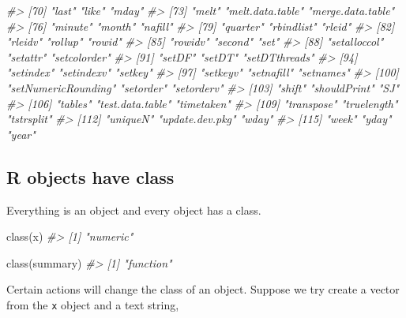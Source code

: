 \documentclass[
]{book}
\newenvironment{Shaded}{\begin{snugshade}}{\end{snugshade}}
\newcommand{\CommentTok}[1]{\textcolor[rgb]{0.56,0.35,0.01}{\textit{#1}}}
\newcommand{\FunctionTok}[1]{\textcolor[rgb]{0.00,0.00,0.00}{#1}}
\newcommand{\NormalTok}[1]{#1}
\begin{document}
\begin{Shaded}
\begin{Highlighting}[]
\CommentTok{\#\textgreater{}  [70] "last"               "like"               "mday"              }
\CommentTok{\#\textgreater{}  [73] "melt"               "melt.data.table"    "merge.data.table"  }
\CommentTok{\#\textgreater{}  [76] "minute"             "month"              "nafill"            }
\CommentTok{\#\textgreater{}  [79] "quarter"            "rbindlist"          "rleid"             }
\CommentTok{\#\textgreater{}  [82] "rleidv"             "rollup"             "rowid"             }
\CommentTok{\#\textgreater{}  [85] "rowidv"             "second"             "set"               }
\CommentTok{\#\textgreater{}  [88] "setalloccol"        "setattr"            "setcolorder"       }
\CommentTok{\#\textgreater{}  [91] "setDF"              "setDT"              "setDTthreads"      }
\CommentTok{\#\textgreater{}  [94] "setindex"           "setindexv"          "setkey"            }
\CommentTok{\#\textgreater{}  [97] "setkeyv"            "setnafill"          "setnames"          }
\CommentTok{\#\textgreater{} [100] "setNumericRounding" "setorder"           "setorderv"         }
\CommentTok{\#\textgreater{} [103] "shift"              "shouldPrint"        "SJ"                }
\CommentTok{\#\textgreater{} [106] "tables"             "test.data.table"    "timetaken"         }
\CommentTok{\#\textgreater{} [109] "transpose"          "truelength"         "tstrsplit"         }
\CommentTok{\#\textgreater{} [112] "uniqueN"            "update.dev.pkg"     "wday"              }
\CommentTok{\#\textgreater{} [115] "week"               "yday"               "year"}
\end{Highlighting}
\end{Shaded}

\hypertarget{r-objects-have-class}{%
\subsection{R objects have class}\label{r-objects-have-class}}

Everything is an object and every object has a class.

\begin{Shaded}
\begin{Highlighting}[]
\FunctionTok{class}\NormalTok{(x)}
\CommentTok{\#\textgreater{} [1] "numeric"}

\FunctionTok{class}\NormalTok{(summary)}
\CommentTok{\#\textgreater{} [1] "function"}
\end{Highlighting}
\end{Shaded}

Certain actions will change the class of an object. Suppose we try create a vector from the \texttt{x} object and a text string,
\end{document}
